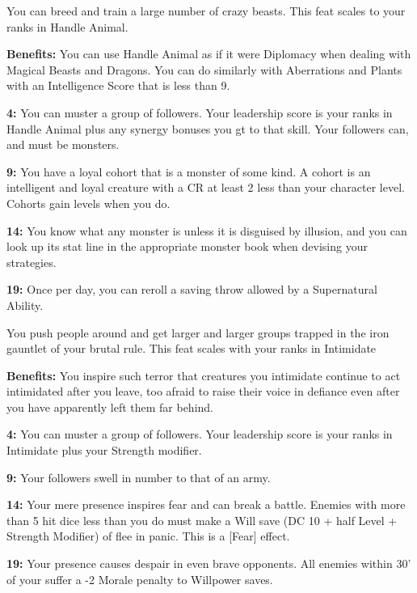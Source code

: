 You can breed and train a large number of crazy beasts. This feat scales to your ranks in Handle Animal.

\textbf{Benefits:} You can use Handle Animal as if it were Diplomacy when dealing with Magical Beasts and Dragons. You can do similarly with Aberrations and Plants with an Intelligence Score that is less than 9.

\textbf{4:} You can muster a group of followers. Your leadership score is your ranks in Handle Animal plus any synergy bonuses you gt to that skill. Your followers can, and must be monsters.

\textbf{9:} You have a loyal cohort that is a monster of some kind. A cohort is an intelligent and loyal creature with a CR at least 2 less than your character level. Cohorts gain levels when you do.

\textbf{14:} You know what any monster is unless it is disguised by illusion, and you can look up its stat line in the appropriate monster book when devising your strategies.

\textbf{19:} Once per day, you can reroll a saving throw allowed by a Supernatural Ability.

You push people around and get larger and larger groups trapped in the iron gauntlet of your brutal rule. This feat scales with your ranks in Intimidate

\textbf{Benefits:} You inspire such terror that creatures you intimidate continue to act intimidated after you leave, too afraid to raise their voice in defiance even after you have apparently left them far behind.

\textbf{4:} You can muster a group of followers. Your leadership score is your ranks in Intimidate plus your Strength modifier.

\textbf{9:} Your followers swell in number to that of an army.

\textbf{14:} Your mere presence inspires fear and can break a battle. Enemies with more than 5 hit dice less than you do must make a Will save (DC 10 + half Level + Strength Modifier) of flee in panic. This is a [Fear] effect.

\textbf{19:} Your presence causes despair in even brave opponents. All enemies within 30' of your suffer a -2 Morale penalty to Willpower saves.
